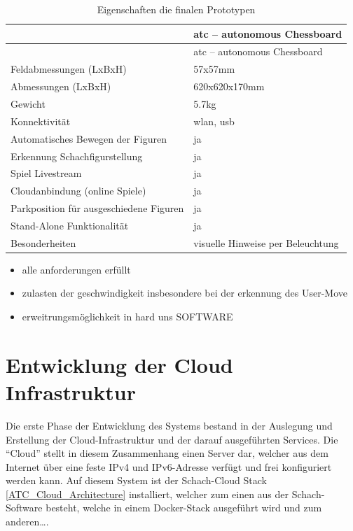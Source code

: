 \begin{longtable}[]{@{}ll@{}}
\caption{Eigenschaften die finalen Prototypen}\tabularnewline
\toprule
& \gls{atc} -- autonomous Chessboard\tabularnewline
\midrule
\endfirsthead
\toprule
& \gls{atc} -- autonomous Chessboard\tabularnewline
\midrule
\endhead
Feldabmessungen (LxBxH) & 57x57mm\tabularnewline
Abmessungen (LxBxH) & 620x620x170mm\tabularnewline
Gewicht & 5.7kg\tabularnewline
Konnektivität & \gls{wlan}, \gls{usb}\tabularnewline
Automatisches Bewegen der Figuren & ja\tabularnewline
Erkennung Schachfigurstellung & ja\tabularnewline
Spiel Livestream & ja\tabularnewline
Cloudanbindung (online Spiele) & ja\tabularnewline
Parkposition für ausgeschiedene Figuren & ja\tabularnewline
Stand-Alone Funktionalität & ja\tabularnewline
Besonderheiten & visuelle Hinweise per Beleuchtung\tabularnewline
\bottomrule
\end{longtable}

\begin{itemize}
\tightlist
\item
  alle anforderungen erfüllt
\item
  zulasten der geschwindigkeit insbesondere bei der erkennung des
  User-Move
\item
  erweitrungsmöglichkeit in hard uns SOFTWARE
\end{itemize}

\hypertarget{entwicklung-der-cloud-infrastruktur}{%
\chapter{Entwicklung der Cloud
Infrastruktur}\label{entwicklung-der-cloud-infrastruktur}}

Die erste Phase der Entwicklung des Systems bestand in der Auslegung und
Erstellung der Cloud-Infrastruktur und der darauf ausgeführten Services.
Die ``Cloud'' stellt in diesem Zusammenhang einen Server dar, welcher
aus dem Internet über eine feste IPv4 und IPv6-Adresse verfügt und frei
konfiguriert werden kann. Auf diesem System ist der Schach-Cloud Stack
\ref{ATC_Cloud_Architecture} installiert, welcher zum einen aus der
Schach-Software besteht, welche in einem Docker-Stack ausgeführt wird
und zum anderen\ldots{}.

